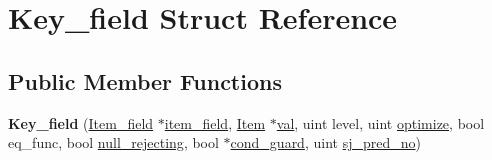 \hypertarget{structKey__field}{}\section{Key\+\_\+field Struct Reference}
\label{structKey__field}
\subsection*{Public Member Functions}
\begin{DoxyCompactItemize}
\item 
\mbox{\label{structKey__field_a41bf18efe090d6263288336eb8d46782}} 
{\bfseries Key\+\_\+field} (\mbox{\hyperlink{classItem__field}{Item\+\_\+field}} $\ast$\mbox{\hyperlink{structKey__field_a39e101c4060217fef72441bd79965d72}{item\+\_\+field}}, \mbox{\hyperlink{classItem}{Item}} $\ast$\mbox{\hyperlink{structKey__field_ab487719698cf68eea0283f1b0eac01e7}{val}}, uint level, uint \mbox{\hyperlink{structKey__field_a8020afcf7b7a870d86586052442e347f}{optimize}}, bool eq\+\_\+func, bool \mbox{\hyperlink{structKey__field_ad15eb695b878f6436d97bcc8f37fad20}{null\+\_\+rejecting}}, bool $\ast$\mbox{\hyperlink{structKey__field_a16b72e1543518a93bca63b15f6274598}{cond\+\_\+guard}}, uint \mbox{\hyperlink{structKey__field_a3875eb5a8e4115e34a319bd770b251c8}{sj\+\_\+pred\+\_\+no}})
\end{DoxyCompactItemize}
